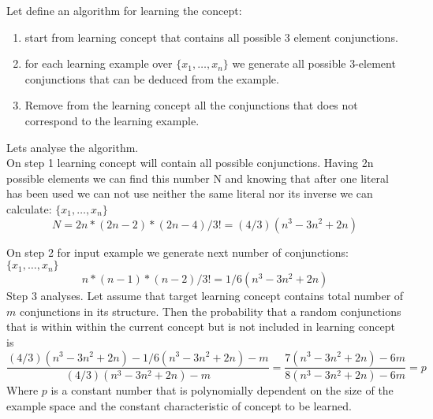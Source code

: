 Let define an algorithm for learning the concept:
\begin{enumerate}

  \item start from learning concept that contains all possible 3 element conjunctions.
  \item  for each learning example over $\{x_{1},\ldots,x_{n}\}$ we generate all possible 3-element conjunctions that can be deduced from the example.
  \item Remove from the learning concept all the conjunctions that does not correspond to the learning example.

\end{enumerate}


Lets analyse the algorithm.
\[\]
On step 1 learning concept will contain all possible conjunctions. Having 2n possible elements we can find this number N and knowing that after one literal has been used we can not use neither the same literal nor its inverse we can calculate:
$\{x_{1},\ldots,x_{n}\}$
\[
N = 2n*(2n-2)*(2n-4)/3!=(4/3)(n^3-3n^2+2n)
\]

On step 2 for input example we generate next number of conjunctions:
$\{x_{1},\ldots,x_{n}\}$
\[
n*(n-1)*(n-2)/3!=1/6(n^3-3n^2+2n)
\]
Step 3 analyses. Let assume that target learning concept contains total number of $m$ conjunctions in its  structure. Then the probability that a random conjunctions that is within within the current concept but is not included in learning concept is
\[
\frac{(4/3)(n^3-3n^2+2n) - 1/6(n^3-3n^2+2n) - m}{(4/3)(n^3-3n^2+2n) - m}  = 
\frac{7(n^3-3n^2+2n) - 6m}{8(n^3-3n^2+2n) - 6m} =p 
\] 
Where $p$ is a constant number that is polynomially dependent on the size of the example space and the constant characteristic of concept to be learned.

